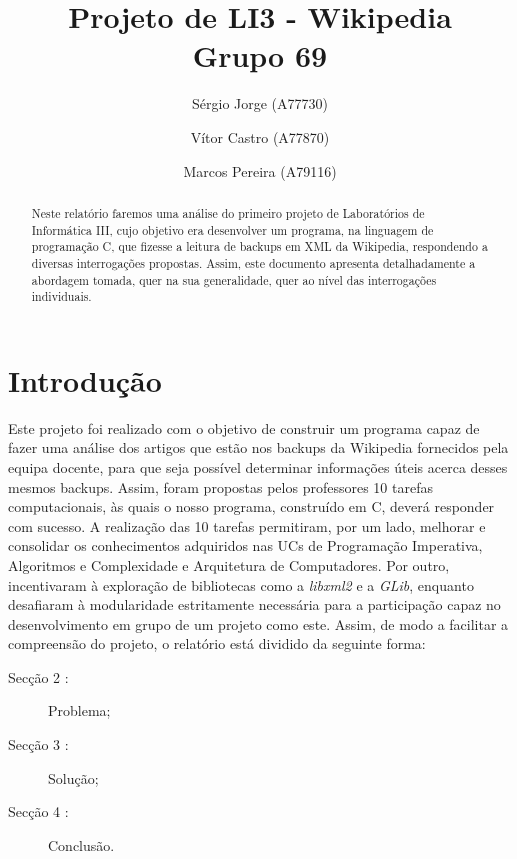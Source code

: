 \documentclass[a4paper]{article}
\title{Projeto de LI3 - Wikipedia\\Grupo 69}
\author{Sérgio Jorge (A77730) \and Vítor Castro (A77870) \and Marcos Pereira (A79116)}
\date{}
\begin{document}
\maketitle

\begin{abstract}
Neste relatório faremos uma análise do primeiro projeto de Laboratórios de Informática III, cujo objetivo era desenvolver um programa, na linguagem de programação C, que fizesse a leitura de backups em XML da Wikipedia, respondendo a diversas interrogações propostas. Assim, este documento apresenta detalhadamente a abordagem tomada, quer na sua generalidade, quer ao nível das interrogações individuais.
\end{abstract}

\tableofcontents

\section{Introdução}
\label{sec:intro}
Este projeto foi realizado com o objetivo de construir um programa capaz de fazer uma análise dos artigos que estão nos backups da Wikipedia fornecidos pela equipa docente, para que seja possível determinar informações úteis acerca desses mesmos backups.
Assim, foram propostas pelos professores 10 tarefas computacionais, às quais o nosso programa, construído em C, deverá responder com sucesso. A realização das 10 tarefas permitiram, por um lado, melhorar e consolidar os conhecimentos adquiridos nas UCs de Programação Imperativa, Algoritmos e Complexidade e Arquitetura de Computadores. Por outro, incentivaram à exploração de bibliotecas como a \textit{libxml2} e a \textit{GLib}, enquanto desafiaram à modularidade estritamente necessária para a participação capaz no desenvolvimento em grupo de um projeto como este.
Assim, de modo a facilitar a compreensão do projeto, o relatório está dividido da seguinte forma:
\begin{description}
    \item[Secção 2 :] Problema;
    \item[Secção 3 :] Solução;
    \item[Secção 4 :] Conclusão.
\end{description}
\end{document}
